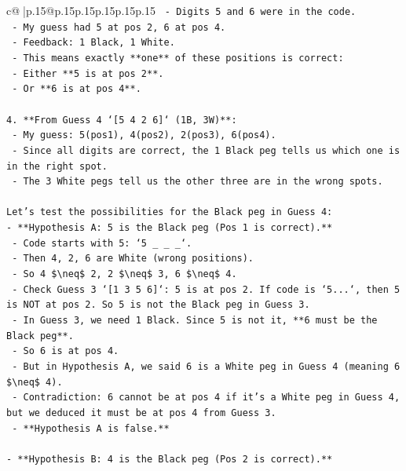 \documentclass{article}
\begin{document}
{\begin{supertabular}{c@{$\;$}|p{.15\linewidth}@{}p{.15\linewidth}p{.15\linewidth}p{.15\linewidth}p{.15\linewidth}p{.15\linewidth}}
{{{\texttt{    {-} Digits 5 and 6 were in the code.} \\
\texttt{    {-} My guess had 5 at pos 2, 6 at pos 4.} \\
\texttt{    {-} Feedback: 1 Black, 1 White.} \\
\texttt{    {-} This means exactly **one** of these positions is correct:} \\
\texttt{        {-} Either **5 is at pos 2**.} \\
\texttt{        {-} Or **6 is at pos 4**.} \\
\\ 
\texttt{4.  **From Guess 4 `{[}5 4 2 6{]}` (1B, 3W)**:} \\
\texttt{    {-} My guess: 5(pos1), 4(pos2), 2(pos3), 6(pos4).} \\
\texttt{    {-} Since all digits are correct, the 1 Black peg tells us which one is in the right spot.} \\
\texttt{    {-} The 3 White pegs tell us the other three are in the wrong spots.} \\
\\ 
\texttt{Let's test the possibilities for the Black peg in Guess 4:} \\
\texttt{{-} **Hypothesis A: 5 is the Black peg (Pos 1 is correct).**} \\
\texttt{    {-} Code starts with 5: `5 \_ \_ \_`.} \\
\texttt{    {-} Then 4, 2, 6 are White (wrong positions).} \\
\texttt{    {-} So 4 \$\textbackslash{}neq\$ 2, 2 \$\textbackslash{}neq\$ 3, 6 \$\textbackslash{}neq\$ 4.} \\
\texttt{    {-} Check Guess 3 `{[}1 3 5 6{]}`: 5 is at pos 2. If code is `5...`, then 5 is NOT at pos 2. So 5 is not the Black peg in Guess 3.} \\
\texttt{    {-} In Guess 3, we need 1 Black. Since 5 is not it, **6 must be the Black peg**.} \\
\texttt{    {-} So 6 is at pos 4.} \\
\texttt{    {-} But in Hypothesis A, we said 6 is a White peg in Guess 4 (meaning 6 \$\textbackslash{}neq\$ 4).} \\
\texttt{    {-} Contradiction: 6 cannot be at pos 4 if it's a White peg in Guess 4, but we deduced it must be at pos 4 from Guess 3.} \\
\texttt{    {-} **Hypothesis A is false.**} \\
\\ 
\texttt{{-} **Hypothesis B: 4 is the Black peg (Pos 2 is correct).**} \\
}}}
\end{supertabular}}
\end{document}

